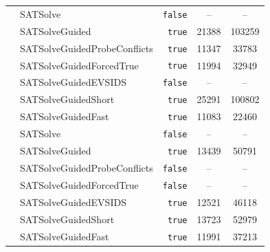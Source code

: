 \documentclass[twocolumn,10pt,a4paper]{article}
\newcommand{\atom}[1]{\colorbox{Gray!30}{\ttfamily #1}}
\begin{document}
\begin{itemize}
\begin{figure}[h]
{\begin{minipage}{.45\columnwidth}
{\begin{tabular}{@{}>{\ttfamily\bfseries}l l r S[table-format=5.0] S[table-format=6.0]@{}}
				  & \atom{SATSolve}                     & \texttt{false}  & {--}  & {--} \\
				  & \atom{SATSolveGuided}               & \texttt{true} & 21388 & 103259 \\
				  & \atom{SATSolveGuidedProbeConflicts} & \texttt{true} & 11347 &  33783 \\
				  & \atom{SATSolveGuidedForcedTrue}     & \texttt{true} & 11994 &  32949 \\
				  & \atom{SATSolveGuidedEVSIDS}         & \texttt{false}  & {--}  & {--} \\
				  & \atom{SATSolveGuidedShort}          & \texttt{true} & 25291 & 100802 \\
				  & \atom{SATSolveGuidedFast}           & \texttt{true} & 11083 &  22460 \\
			  \addlinespace

				  & \atom{SATSolve}                     & \texttt{false}  & {--}  & {--} \\
				  & \atom{SATSolveGuided}               & \texttt{true} & 13439 & 50791 \\
				  & \atom{SATSolveGuidedProbeConflicts} & \texttt{false}  & {--}  & {--} \\
				  & \atom{SATSolveGuidedForcedTrue}     & \texttt{false}  & {--}  & {--} \\
				  & \atom{SATSolveGuidedEVSIDS}         & \texttt{true} & 12521 & 46118 \\
				  & \atom{SATSolveGuidedShort}          & \texttt{true} & 13723 & 52979 \\
				  & \atom{SATSolveGuidedFast}           & \texttt{true} & 11991 & 37213 \\


\end{tabular}}
\end{minipage}}
\end{figure}
\end{itemize}
\end{document}
